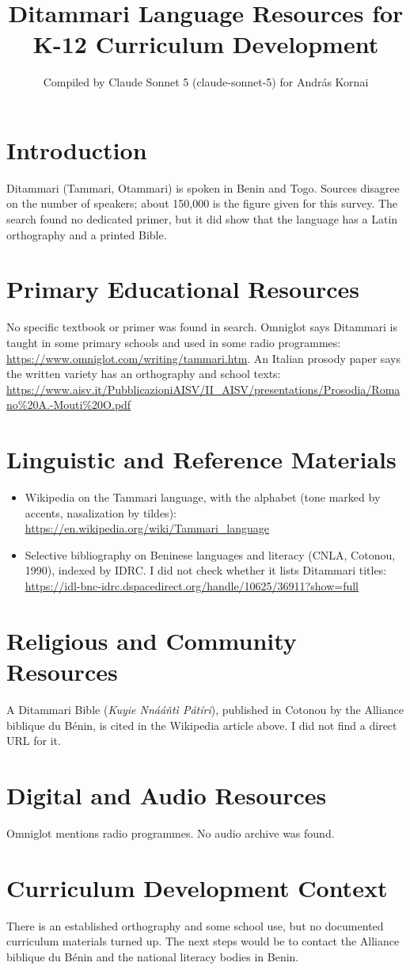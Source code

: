 \documentclass[12pt]{article}
\title{Ditammari Language Resources for K-12 Curriculum Development}
\author{Compiled by Claude Sonnet 5 (claude-sonnet-5) for Andr\'as Kornai}
\date{}
\begin{document}
\maketitle

\section{Introduction}
Ditammari (Tammari, Otammari) is spoken in Benin and Togo. Sources disagree on the number of speakers; about 150,000 is the figure given for this survey. The search found no dedicated primer, but it did show that the language has a Latin orthography and a printed Bible.

\section{Primary Educational Resources}
No specific textbook or primer was found in search. Omniglot says Ditammari is taught in some primary schools and used in some radio programmes: \url{https://www.omniglot.com/writing/tammari.htm}. An Italian prosody paper says the written variety has an orthography and school texts: \url{https://www.aisv.it/PubblicazioniAISV/II_AISV/presentations/Prosodia/Romano%20A.-Mouti%20O.pdf}

\section{Linguistic and Reference Materials}
\begin{itemize}
\item Wikipedia on the Tammari language, with the alphabet (tone marked by accents, nasalization by tildes): \url{https://en.wikipedia.org/wiki/Tammari_language}
\item Selective bibliography on Beninese languages and literacy (CNLA, Cotonou, 1990), indexed by IDRC. I did not check whether it lists Ditammari titles: \url{https://idl-bnc-idrc.dspacedirect.org/handle/10625/36911?show=full}
\end{itemize}

\section{Religious and Community Resources}
A Ditammari Bible (\emph{Kuyie Nn\'a\'a\v{n}t\`i P\'at\'iri}), published in Cotonou by the Alliance biblique du B\'enin, is cited in the Wikipedia article above. I did not find a direct URL for it.

\section{Digital and Audio Resources}
Omniglot mentions radio programmes. No audio archive was found.

\section{Curriculum Development Context}
There is an established orthography and some school use, but no documented curriculum materials turned up. The next steps would be to contact the Alliance biblique du B\'enin and the national literacy bodies in Benin.
\end{document}
